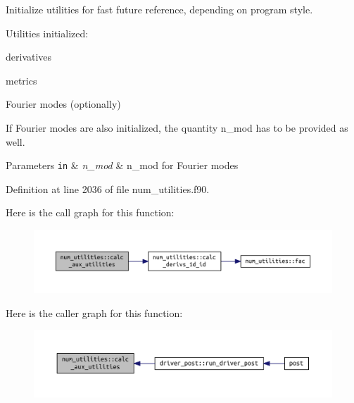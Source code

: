 Initialize utilities for fast future reference, depending on program style. 

Utilities initialized\+:
\begin{DoxyItemize}
\item derivatives
\item metrics
\item Fourier modes (optionally)
\end{DoxyItemize}

If Fourier modes are also initialized, the quantity {\ttfamily n\+\_\+mod} has to be provided as well.


\begin{DoxyParams}[1]{Parameters}
\mbox{\tt in}  & {\em n\+\_\+mod} & n\+\_\+mod for Fourier modes \\
\hline
\end{DoxyParams}


Definition at line 2036 of file num\+\_\+utilities.\+f90.

Here is the call graph for this function\+:\nopagebreak
\begin{figure}[H]
\begin{center}
\leavevmode
\includegraphics[width=350pt]{namespacenum__utilities_af461ae4c95a7a45da875dcf311e323f5_cgraph}
\end{center}
\end{figure}
Here is the caller graph for this function\+:\nopagebreak
\begin{figure}[H]
\begin{center}
\leavevmode
\includegraphics[width=350pt]{namespacenum__utilities_af461ae4c95a7a45da875dcf311e323f5_icgraph}
\end{center}
\end{figure}
\mbox{\label{namespacenum__utilities_a4dffe3beba7165dd17cff19a99a9e2ac}} 
